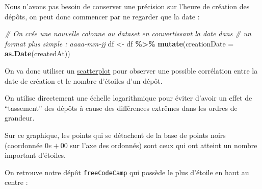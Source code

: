 \documentclass[
]{article}
\newenvironment{Shaded}{\begin{snugshade}}{\end{snugshade}}
\newcommand{\AttributeTok}[1]{\textcolor[rgb]{0.13,0.29,0.53}{#1}}
\newcommand{\CommentTok}[1]{\textcolor[rgb]{0.56,0.35,0.01}{\textit{#1}}}
\newcommand{\FunctionTok}[1]{\textcolor[rgb]{0.13,0.29,0.53}{\textbf{#1}}}
\newcommand{\NormalTok}[1]{#1}
\newcommand{\OtherTok}[1]{\textcolor[rgb]{0.56,0.35,0.01}{#1}}
\newcommand{\SpecialCharTok}[1]{\textcolor[rgb]{0.81,0.36,0.00}{\textbf{#1}}}
\begin{document}
Nous n'avons pas besoin de conserver une précision sur l'heure de
création des dépôts, on peut donc commencer par ne regarder que la date
:

\begin{Shaded}
\begin{Highlighting}[]
\CommentTok{\# On crée une nouvelle colonne au dataset en convertissant la date dans}
\CommentTok{\# un format plus simple : aaaa{-}mm{-}jj}
\NormalTok{df }\OtherTok{\textless{}{-}}\NormalTok{ df }\SpecialCharTok{\%\textgreater{}\%} \FunctionTok{mutate}\NormalTok{(}\AttributeTok{creationDate =} \FunctionTok{as.Date}\NormalTok{(createdAt))}
\end{Highlighting}
\end{Shaded}

On va donc utiliser un
\href{https://datavizcatalogue.com/methods/scatterplot.html}{scatterplot}
pour observer une possible corrélation entre la date de création et le
nombre d'étoiles d'un dépôt.

On utilise directement une échelle logarithmique pour éviter d'avoir un
effet de ``tassement'' des dépôts à cause des différences extrêmes dans
les ordres de grandeur.

Sur ce graphique, les points qui se détachent de la base de points noirs
(coordonnée \(0e+00\) sur l'axe des ordonnés) sont ceux qui ont atteint
un nombre important d'étoiles.

On retrouve notre dépôt \texttt{freeCodeCamp} qui possède le plus
d'étoile en haut au centre :
\end{document}
